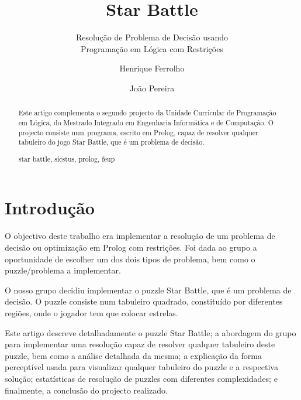 \documentclass[runningheads,a4paper]{llncs}
\newcommand{\keywords}[1]{\par\addvspace\baselineskip
\noindent\keywordname\enspace\ignorespaces#1}
\begin{document}
\mainmatter  %

\title{Star Battle}
\subtitle{Resolução de Problema de Decisão usando\\
Programação em Lógica com Restrições}

\author{Henrique Ferrolho\and João Pereira}


\maketitle


\begin{abstract}
Este artigo complementa o segundo projecto da Unidade Curricular de Programação em Lógica, do Mestrado Integrado em Engenharia Informática e de Computação. O projecto consiste num programa, escrito em Prolog, capaz de resolver qualquer tabuleiro do jogo Star Battle, que é um problema de decisão.
\keywords{star battle, sicstus, prolog, feup}
\end{abstract}


\section{Introdução}

O objectivo deste trabalho era implementar a resolução de um problema de decisão ou optimização em Prolog com restrições. Foi dada ao grupo a oportunidade de escolher um dos dois tipos de problema, bem como o puzzle/problema a implementar.

O nosso grupo decidiu implementar o puzzle Star Battle, que é um problema de decisão. O puzzle consiste num tabuleiro quadrado, constituído por diferentes regiões, onde o jogador tem que colocar estrelas.

Este artigo descreve detalhadamente o puzzle Star Battle; a abordagem do grupo para implementar uma resolução capaz de resolver qualquer tabuleiro deste puzzle, bem como a análise detalhada da mesma; a explicação da forma perceptível usada para visualizar qualquer tabuleiro do puzzle e a respectiva solução; estatísticas de resolução de puzzles com diferentes complexidades; e finalmente, a conclusão do projecto realizado.
\end{document}
